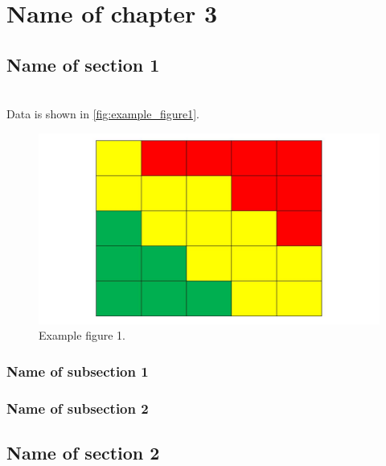 \documentclass[../main.tex]{subfiles}
\begin{document}
    
    \chapter{Name of chapter 3}
    \lipsum[1]
    \section{Name of section  1}
    \lipsum[1]\\
    Data is shown in \autoref{fig:example_figure1}.
    
    \begin{figure}[H]
    \centering
    \includegraphics[width=1.0\textwidth]{Figures/example_figure1.JPG}
    \caption{Example figure 1.}
    \label{fig:example_figure1}
    \end{figure}
    
    \lipsum[1]
    
    \subsection{Name of subsection 1}
    \lipsum[1]
    
    \subsection{Name of subsection 2}
    \lipsum[1]
    
    \section{Name of section 2}
    
\end{document}
